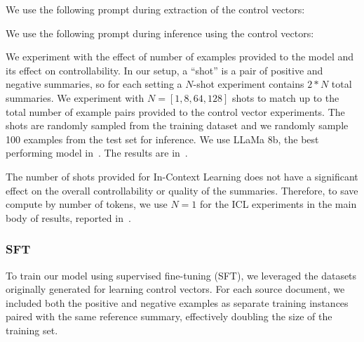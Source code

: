 
We use the following prompt during extraction of the control vectors:


We use the following prompt during inference using the control vectors:


We experiment with the effect of number of examples provided to the model and its effect on controllability. In our setup, a ``shot'' is a pair of positive and negative summaries, so for each setting a $N$-shot experiment contains $2*N$ total summaries. We experiment with $N=[1,8,64,128]$ shots to match up to the total number of example pairs provided to the control vector experiments. The shots are randomly sampled from the training dataset and we randomly sample 100 examples from the test set for inference. We use LLaMa 8b, the best performing model in~. The results are in~.


The number of shots provided for In-Context Learning does not have a significant effect on the overall controllability or quality of the summaries. Therefore, to save compute by number of tokens, we use $N=1$ for the ICL experiments in the main body of results, reported in~.


\subsubsection{SFT}
To train our model using supervised fine-tuning (SFT), we leveraged the datasets originally generated for learning control vectors. For each source document, we included both the positive and negative examples as separate training instances paired with the same reference summary, effectively doubling the size of the training set.

